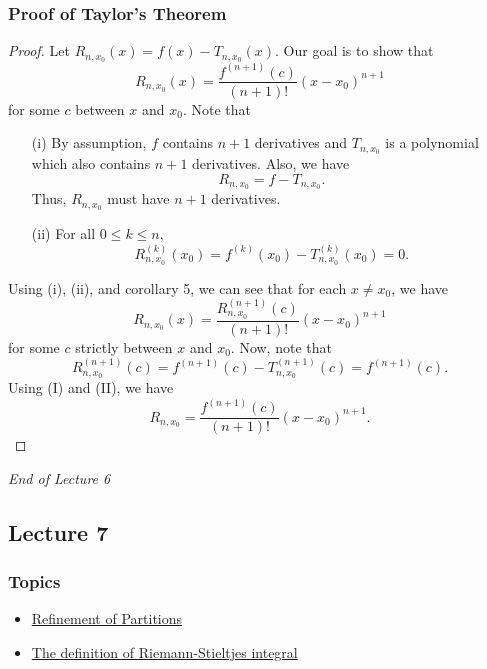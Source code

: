 \subsubsection{Proof of Taylor's Theorem}
\begin{proof}
Let \( {R}_{n,{x}_{0}}(x) = f(x) - {T}_{n,{x}_{0}}(x)  \). Our goal is to show that 
\[  {R}_{n,{x}_{0}}(x) = \frac{ f^{(n+1)}(c) }{ (n+1)! } (x - {x}_{0})^{n+1} \]
for some \( c  \) between \( x  \) and \( {x}_{0} \). Note that 
\begin{enumerate}
    \item[(i)] By assumption, \( f \) contains \( n + 1  \) derivatives and \( {T}_{n,{x}_{0}}  \) is a polynomial which also contains \( n + 1  \) derivatives. Also, we have 
        \[  {R}_{n,{x}_{0}} = f - {T}_{n,{x}_{0}}. \]
        Thus, \( {R}_{n,{x}_{0}}  \) must have \( n + 1  \) derivatives.
    \item[(ii)] For all \( 0 \leq k \leq n  \),
        \[  {R}_{n, {x}_{0}}^{(k)}({x}_{0}) = f^{(k)}({x}_{0}) - {T}_{n,{x}_{0}}^{(k)}({x}_{0}) = 0. \]
\end{enumerate}
Using (i), (ii), and corollary 5, we can see that for each \( x \neq {x}_{0} \), we have 
\[  R_{n,{x}_{0}}(x) = \frac{ {R}_{n,{x}_{0}}^{(n+1)}(c) }{ (n+1)! }  (x - {x}_{0})^{n+1} \tag{I} \]
for some \( c  \) strictly between \( x  \) and \( {x}_{0} \). Now, note that 
\[  {R}_{n,{x}_{0}}^{(n+1)}(c) = f^{(n+1)}(c) - {T}_{n,{x}_{0}}^{(n+1)}(c) = f^{(n+1)}(c). \tag{II}  \]
Using (I) and (II), we have 
\[  {R}_{n,{x}_{0}} = \frac{ f^{(n+1)}(c) }{ (n+1)! } (x - {x}_{0})^{n+1}.\]
\end{proof}

\begin{center}
    \textit{End of Lecture 6} 
\end{center}
\subsection{Lecture 7}

\subsubsection{Topics}

\begin{itemize}
    \item {\hyperref[Refinement of Partitions]{Refinement of Partitions}}
    \item {\hyperref[The definition of Riemann-Stieltjes integral]{The definition of Riemann-Stieltjes integral}}
\end{itemize}

